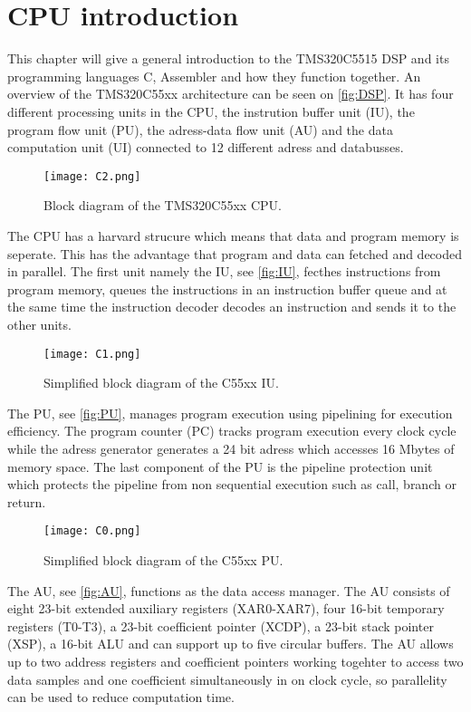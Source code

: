 \chapter{CPU introduction}
This chapter will give a general introduction to the TMS320C5515 DSP and its programming languages C, Assembler and how they function together. An overview of the TMS320C55xx architecture can be seen on \autoref{fig:DSP}. It has four different processing units in the CPU, the instrution buffer unit (IU), the program flow unit (PU), the adress-data flow unit (AU) and the data computation unit (UI) connected to 12 different adress and databusses.  
\begin{figure}[H]
\centering
\texttt{[image: C2.png]}
\caption{Block diagram of the TMS320C55xx CPU.}
\label{fig:DSP}
\end{figure}
The CPU has a harvard strucure which means that data and program memory is seperate. This has the advantage that program and data can fetched and decoded in parallel. The first unit namely the IU, see \autoref{fig:IU}, fecthes instructions from program memory, queues the instructions in an instruction buffer queue and at the same time the instruction decoder decodes an instruction and sends it to the other units.
\begin{figure}[H]
\centering
\texttt{[image: C1.png]}
\caption{Simplified block diagram of the C55xx IU.}
\label{fig:IU}
\end{figure}
The PU, see \autoref{fig:PU}, manages program execution using pipelining for execution efficiency. The program counter (PC) tracks program execution every clock cycle while the adress generator generates a 24 bit adress which accesses 16 Mbytes of memory space. The last component of the PU is the pipeline protection unit which protects the pipeline from non sequential execution such as call, branch or return.
\begin{figure}[H]
\centering
\texttt{[image: C0.png]}
\caption{Simplified block diagram of the C55xx PU.}
\label{fig:PU}
\end{figure}
The AU, see \autoref{fig:AU}, functions as the data access manager. The AU consists of eight 23-bit extended auxiliary registers (XAR0-XAR7), four 16-bit temporary registers (T0-T3), a 23-bit coefficient pointer (XCDP), a 23-bit stack pointer (XSP), a 16-bit ALU and can support up to five circular buffers. The AU allows up to two address registers and coefficient pointers working togehter to access two data samples and one coefficient simultaneously in on clock cycle, so parallelity can be used to reduce computation time. 

